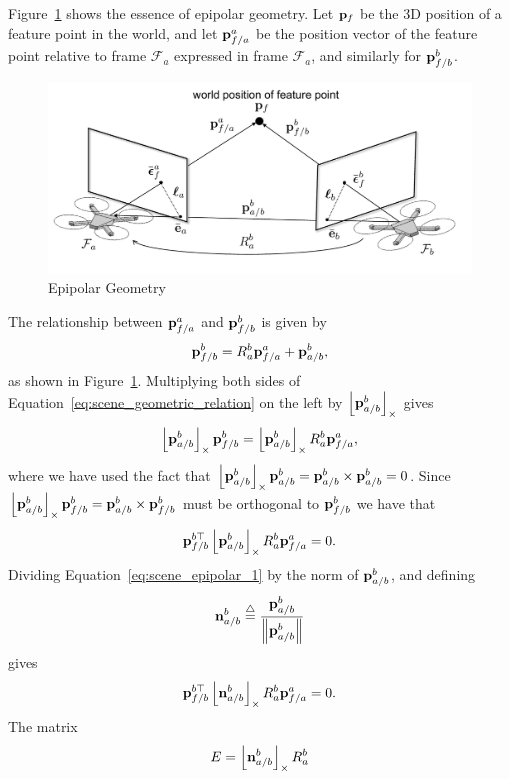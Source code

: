 Figure~\ref{fig:epipolar_geometry} shows the essence of epipolar geometry.  
Let $\mathbf{p}_f$ be the 3D position of a feature point in the world, and let $\mathbf{p}_{f/a}^a$ be the position vector of the feature point relative to frame $\mathcal{F}_a$ expressed in frame $\mathcal{F}_a$, and similarly for $\mathbf{p}_{f/b}^b$.
	\begin{figure}
		\includegraphics[width=\linewidth]{chap8_scene_reconstruction/figures/epipolar_geometry_quad}
		\caption{Epipolar Geometry}
		\label{fig:epipolar_geometry}
	\end{figure}
The relationship between $\mathbf{p}_{f/a}^a$ and $\mathbf{p}_{f/b}^b$ is given by
\begin{equation}\label{eq:scene_geometric_relation}
\pbf_{f/b}^b = R_a^b \pbf_{f/a}^a + \pbf_{a/b}^b,
\end{equation}
as shown in Figure~\ref{fig:epipolar_geometry}.  Multiplying both sides of  Equation~\eqref{eq:scene_geometric_relation} on the left by $\left\lfloor\mathbf{p}_{a/b}^b\right\rfloor_{\times}$ gives
\[
\left\lfloor\mathbf{p}_{a/b}^b\right\rfloor_{\times} \mathbf{p}_{f/b}^b = \left\lfloor\mathbf{p}_{a/b}^b\right\rfloor_{\times} R_a^b \mathbf{p}_{f/a}^a,
\]
where we have used the fact that $\left\lfloor\mathbf{p}_{a/b}^b\right\rfloor_{\times}\mathbf{p}_{a/b}^b = \mathbf{p}_{a/b}^b \times \mathbf{p}_{a/b}^b = 0$. Since $\left\lfloor\mathbf{p}_{a/b}^b\right\rfloor_{\times} \mathbf{p}_{f/b}^b = \mathbf{p}_{a/b}^b \times \mathbf{p}_{f/b}^b$ must be orthogonal to $\mathbf{p}_{f/b}^b$ we have that 
\begin{equation}\label{eq:scene_epipolar_1}
\pbf_{f/b}^{b\top} \ss{\pbf_{a/b}^b} R_a^b \pbf_{f/a}^a = 0.
\end{equation}
Dividing Equation~\eqref{eq:scene_epipolar_1} by the norm of $\mathbf{p}_{a/b}^b$, and defining
\[
\mathbf{n}_{a/b}^b\stackrel{\triangle}{=} \frac{\mathbf{p}_{a/b}^b}{\left\|\mathbf{p}_{a/b}^b\right\|}
\]
gives
\begin{equation}\label{eq:scene_epipolar_2}
\pbf_{f/b}^{b\top} \ss{\nbf_{a/b}^b} R_a^b \pbf_{f/a}^a = 0.
\end{equation}
The matrix 
\begin{equation}\label{eq:scene_essential_matrix}
E = \ss{\nbf_{a/b}^b} R_a^b
\end{equation}
